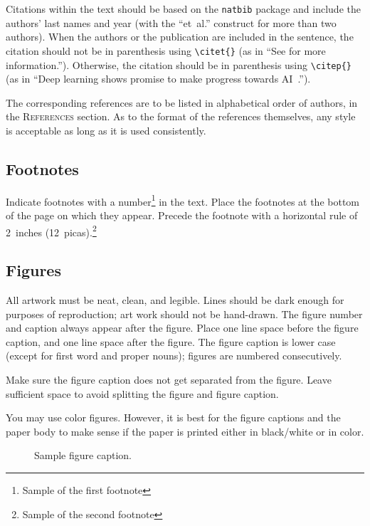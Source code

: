 \documentclass{article} %
\begin{document}
Citations within the text should be based on the \texttt{natbib} package
and include the authors' last names and year (with the ``et~al.'' construct
for more than two authors). When the authors or the publication are
included in the sentence, the citation should not be in parenthesis using \verb|\citet{}| (as
in ``See \citet{Hinton06} for more information.''). Otherwise, the citation
should be in parenthesis using \verb|\citep{}| (as in ``Deep learning shows promise to make progress
towards AI~\citep{Bengio+chapter2007}.'').

The corresponding references are to be listed in alphabetical order of
authors, in the \textsc{References} section. As to the format of the
references themselves, any style is acceptable as long as it is used
consistently.

\subsection{Footnotes}

Indicate footnotes with a number\footnote{Sample of the first footnote} in the
text. Place the footnotes at the bottom of the page on which they appear.
Precede the footnote with a horizontal rule of 2~inches
(12~picas).\footnote{Sample of the second footnote}

\subsection{Figures}

All artwork must be neat, clean, and legible. Lines should be dark
enough for purposes of reproduction; art work should not be
hand-drawn. The figure number and caption always appear after the
figure. Place one line space before the figure caption, and one line
space after the figure. The figure caption is lower case (except for
first word and proper nouns); figures are numbered consecutively.

Make sure the figure caption does not get separated from the figure.
Leave sufficient space to avoid splitting the figure and figure caption.

You may use color figures.
However, it is best for the
figure captions and the paper body to make sense if the paper is printed
either in black/white or in color.
\begin{figure}[h]
\begin{center}
\fbox{\rule[-.5cm]{0cm}{4cm} \rule[-.5cm]{4cm}{0cm}}
\end{center}
\caption{Sample figure caption.}
\end{figure}
\end{document}
